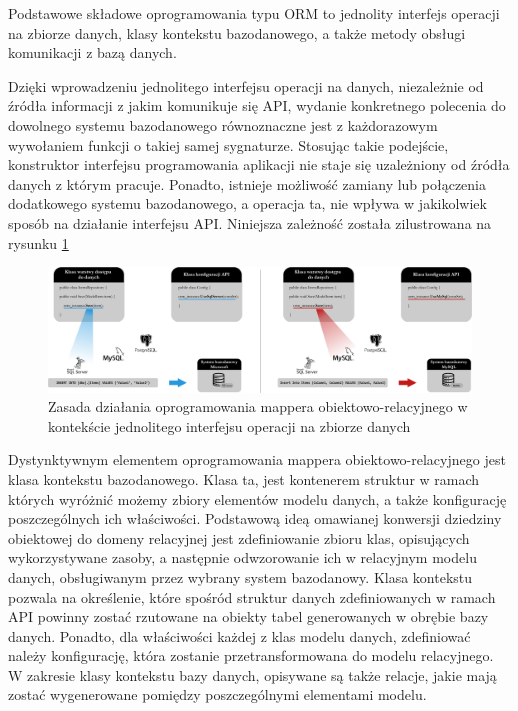 Podstawowe składowe oprogramowania typu ORM to jednolity interfejs operacji na zbiorze danych, klasy kontekstu bazodanowego, a także metody obsługi komunikacji z bazą danych.

Dzięki wprowadzeniu jednolitego interfejsu operacji na danych, niezależnie od źródła informacji z jakim komunikuje się API, wydanie konkretnego polecenia do dowolnego systemu bazodanowego równoznaczne jest z każdorazowym wywołaniem funkcji o takiej samej sygnaturze. Stosując takie podejście, konstruktor interfejsu programowania aplikacji nie staje się uzależniony od źródła danych z którym pracuje. Ponadto, istnieje możliwość zamiany lub połączenia dodatkowego systemu bazodanowego, a operacja ta, nie wpływa w jakikolwiek sposób na działanie interfejsu API. Niniejsza zależność została zilustrowana na rysunku \ref{fig:orm-wyjasnienie}

\begin{figure}[ht]
 \centering
  \includegraphics[width=1\linewidth]{rys03/orm-wyjasnienie}
 \caption{Zasada działania oprogramowania mappera obiektowo-relacyjnego w kontekście jednolitego interfejsu operacji na zbiorze danych}
 \label{fig:orm-wyjasnienie}
\end{figure}

Dystynktywnym elementem oprogramowania mappera obiektowo-relacyjnego jest klasa kontekstu bazodanowego. Klasa ta, jest kontenerem struktur w ramach których wyróżnić możemy zbiory elementów modelu danych, a także konfigurację poszczególnych ich właściwości. Podstawową ideą omawianej konwersji dziedziny obiektowej do domeny relacyjnej jest zdefiniowanie zbioru klas, opisujących wykorzystywane zasoby, a następnie odwzorowanie ich w relacyjnym modelu danych, obsługiwanym przez wybrany system bazodanowy. Klasa kontekstu pozwala na określenie, które spośród struktur danych zdefiniowanych w ramach API powinny zostać rzutowane na obiekty tabel generowanych w obrębie bazy danych. Ponadto, dla właściwości każdej z klas modelu danych, zdefiniować należy konfigurację, która zostanie przetransformowana do modelu relacyjnego. W zakresie klasy kontekstu bazy danych, opisywane są także relacje, jakie mają zostać wygenerowane pomiędzy poszczególnymi elementami modelu.

